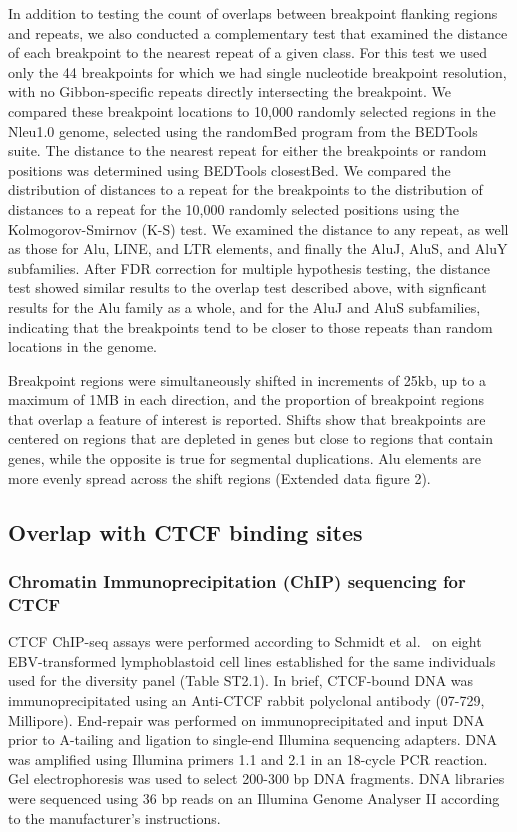 In addition to testing the count of overlaps between breakpoint flanking regions and repeats, we also conducted a complementary test that examined the distance of each breakpoint to the nearest repeat of a given class. For this test we used only the 44 breakpoints for which we had single nucleotide breakpoint resolution, with no Gibbon-specific repeats directly intersecting the breakpoint. We compared these breakpoint locations to 10,000 randomly selected regions in the Nleu1.0 genome, selected using the randomBed program from the BEDTools suite. The distance to the nearest repeat for either the breakpoints or random positions was determined using BEDTools closestBed.  We compared the distribution of distances to a repeat for the breakpoints to the distribution of distances to a repeat for the 10,000 randomly selected positions using the Kolmogorov-Smirnov (K-S) test. We examined the distance to any repeat, as well as those for Alu, LINE, and LTR elements, and finally the AluJ, AluS, and AluY subfamilies. After FDR correction for multiple hypothesis testing, the distance test showed similar results to the overlap test described above, with signficant results for the Alu family as a whole, and for the AluJ and AluS subfamilies, indicating that the breakpoints tend to be closer to those repeats than random locations in the genome.

Breakpoint regions were simultaneously shifted in increments of 25kb, up to a maximum of 1MB in each direction, and the proportion of breakpoint regions that overlap a feature of interest is reported. Shifts show that breakpoints are centered on regions that are depleted in genes but close to regions that contain genes, while the opposite is true for segmental duplications. Alu elements are more evenly spread across the shift regions (Extended data figure 2).

\subsection{Overlap with CTCF binding sites}

\subsubsection{Chromatin Immunoprecipitation (ChIP) sequencing for CTCF}

CTCF ChIP-seq assays were performed according to Schmidt et al.~\cite{Schmidt:2012dt} on eight EBV-transformed lymphoblastoid cell lines established for the same individuals used for the diversity panel (Table ST2.1). In brief, CTCF-bound DNA was immunoprecipitated using an Anti-CTCF rabbit polyclonal antibody (07-729, Millipore). End-repair was performed on immunoprecipitated and input DNA prior to A-tailing and ligation to single-end Illumina sequencing adapters. DNA was amplified using Illumina primers 1.1 and 2.1 in an 18-cycle PCR reaction. Gel electrophoresis was used to select 200-300 bp DNA fragments. DNA libraries were sequenced using 36 bp reads on an Illumina Genome Analyser II according to the manufacturer’s instructions.

